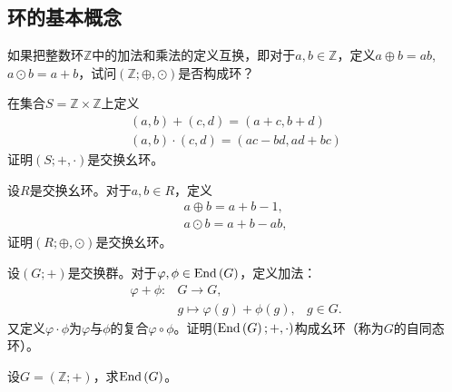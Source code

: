 \subsection{环的基本概念}
\begin{prob}
如果把整数环$\mathbb{Z}$中的加法和乘法的定义互换，即对于$a,b\in \mathbb{Z}$，定义$a\oplus b=ab$,$a\odot b=a+b$，试问$\left(\mathbb{Z};\oplus ,\odot\right)$是否构成环？
\end{prob}

\begin{prob}
在集合$S=\mathbb{Z}\times \mathbb{Z}$上定义
\begin{equation*}
\begin{array}{*{20}{l}}
\left(a,b\right)+\left(c,d\right)=\left(a+c,b+d\right)\\
\left(a,b\right)\cdot \left(c,d\right)=\left(ac-bd,ad+bc\right)
\end{array}
\end{equation*}
证明$\left(S;+,\cdot\right)$是交换幺环。
\end{prob}

\begin{prob}
设$R$是交换幺环。对于$a,b\in R$，定义
\begin{equation*}
\begin{array}{*{20}{l}}
a\oplus b=a+b-1,\\
a\odot b=a+b-ab,
\end{array}
\end{equation*}
证明$\left(R;\oplus ,\odot\right)$是交换幺环。
\end{prob}

\begin{prob}
设$\left(G;+\right)$是交换群。对于$\varphi ,\phi\in {\rm End}\left(G\right)$，定义加法：
\begin{equation*}
\begin{array}{*{20}{l}}
\varphi +\phi:&G\rightarrow G, &\\
&g\longmapsto \varphi \left(g\right)+\phi\left(g\right),&g\in G.
\end{array}
\end{equation*}
又定义$\varphi \cdot \phi$为$\varphi $与$\phi$的复合$\varphi \circ \phi$。证明$\left({\rm End}\left(G\right);+,\cdot\right)$构成幺环（称为$G$的{\heiti 自同态环}）。
\end{prob}

\begin{prob}
设$G=\left(\mathbb{Z};+\right)$，求${\rm End}\left(G\right)$。
\end{prob}

